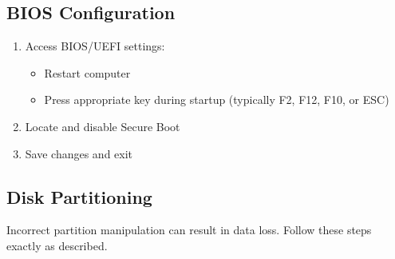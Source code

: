 \documentclass[11pt,a4paper]{article}
\newenvironment{warning}
{\begin{tcolorbox}[colback=warningcolor!10,colframe=warningcolor,title=\textbf{Warning}]}
{\end{tcolorbox}}
\begin{document}
\subsection{BIOS Configuration}
\begin{enumerate}
    \item Access BIOS/UEFI settings:
    \begin{itemize}
        \item Restart computer
        \item Press appropriate key during startup (typically F2, F12, F10, or ESC)
    \end{itemize}
    \item Locate and disable Secure Boot
    \item Save changes and exit
\end{enumerate}

\subsection{Disk Partitioning}
\begin{warning}
Incorrect partition manipulation can result in data loss. Follow these steps exactly as described.
\end{warning}
\end{document}
